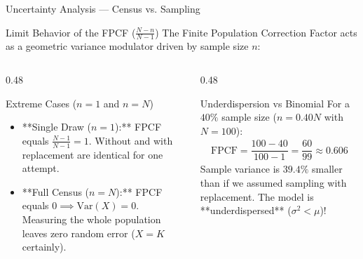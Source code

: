 \documentclass[aspectratio=169,xcolor={dvipsnames,table}]{beamer}
\begin{document}
\begin{frame}{Uncertainty Analysis --- Census vs. Sampling}
	\vspace{-0.15cm}
	\begin{block}{Limit Behavior of the FPCF ($\frac{N-n}{N-1}$)}
		\footnotesize
		The Finite Population Correction Factor acts as a geometric variance modulator driven by sample size $n$:
	\end{block}
	\vspace{-0.2cm}
	\begin{columns}[T]
		\begin{column}{0.48\textwidth}
			\begin{exampleblock}{Extreme Cases ($n=1$ and $n=N$)}
				\scriptsize
				\begin{itemize}
					\itemsep=0.04cm
					\item **Single Draw ($n=1$):** FPCF equals $\frac{N-1}{N-1} = 1$. Without and with replacement are identical for one attempt.
					\item **Full Census ($n=N$):** FPCF equals $0 \implies \text{Var}(X) = 0$. Measuring the whole population leaves zero random error ($X=K$ certainly).
				\end{itemize}
			\end{exampleblock}
		\end{column}
		\begin{column}{0.48\textwidth}
			\begin{alertblock}{Underdispersion vs Binomial}
				\scriptsize
				For a $40\%$ sample size ($n = 0.40 N$ with $N=100$):
				\begin{align*}
					\text{FPCF} = \dfrac{100-40}{100-1} = \dfrac{60}{99} \approx 0.606
				\end{align*}
				Sample variance is $39.4\%$ smaller than if we assumed sampling with replacement. The model is **underdispersed** ($\sigma^2 < \mu$)!
			\end{alertblock}
		\end{column}
	\end{columns}
\end{frame}
\end{document}
